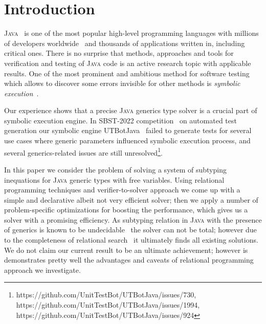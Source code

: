 \section{Introduction}
\label{sec:intro}

\textsc{Java}~\cite{java} is one of the most popular high-level programming languages with millions of developers worldwide~\cite{tiobe} and
thousands of applications written in, including critical ones. There is no surprise that methods, approaches and tools for verification and testing
of \textsc{Java} code is an active research topic with applicable results. One of the most prominent and ambitious method for software testing  which
allows to discover some errors invisible for other methods is \emph{symbolic execution}~\cite{Symbolic}.

Our experience shows that a precise \textsc{Java} generics type solver is a crucial part of symbolic execution engine. In SBST-2022 competition~\cite{SBCT} on
automated test generation our symbolic engine UTBotJava~\cite{UTBot} failed to generate tests for several use cases where generic parameters influenced
symbolic execution process, and several generics-related issues are still unresolved\footnote{https://github.com/UnitTestBot/UTBotJava/issues/730, https://github.com/UnitTestBot/UTBotJava/issues/1994, https://github.com/UnitTestBot/UTBotJava/issues/924}.

In this paper we consider the problem of solving a system of subtyping inequations for \textsc{Java} generic types with free variables. Using relational programming techniques and
verifier-to-solver approach we come up with a simple and declarative albeit not very efficient solver; then we apply a number of problem-specific optimizations for boosting the performance,
which gives us a solver with a promising efficiency. As subtyping relation in \textsc{Java} with the presence of generics is known to be undecidable~\cite{JGTC} the solver can not be total;
however due to the completeness of relational search~\cite{certified} it ultimately finds all existing solutions. We do not claim our current result to be an ultimate achievement; 
however is demonstrates pretty well the advantages and caveats of relational programming approach we investigate.


